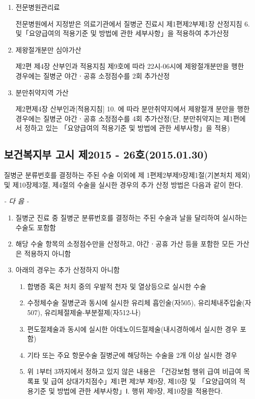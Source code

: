 \begin{enumerate}[가.]
\item 전문병원관리료\par
전문병원에서 지정받은 의료기관에서 질병군 진료시 제1편제2부제1장 산정지침 6. 및「요양급여의 적용기준 및 방법에 관한 세부사항」을 적용하여 추가산정
\item 제왕절개분만 심야가산\par
제2편 제4장 산부인과 적용지침 제9호에 따라 22시-06시에 제왕절개분만을 행한 경우에는 질병군 야간ㆍ공휴 소정점수를 2회 추가산정
\item 분만취약지역 가산\par
제2편제4장 산부인과[적용지침] 10. 에 따라 분만취약지에서 제왕절개 분만을 행한 경우에는 질병군 야간ㆍ공휴 소정점수를 4회 추가산정(단, 분만취약지는 제1편에서 정하고 있는 「요양급여의 적용기준 및 방법에 관한 세부사항」을 적용)
\end{enumerate}

\clearpage
\subsection{보건복지부 고시 제2015 - 26호(2015.01.30)}
질병군 분류번호를 결정하는 주된 수술 이외에 제 1편제2부제9장제1절(기본처치 제외) 및 제10장제3절, 제4절의 수술을 실시한 경우의 추가 산정 방법은 다음과 같이 한다.\par
\begin{center}\emph{- 다 음 -}\end{center}
\begin{enumerate}[1.]\tightlist
\item 질병군 진료 중 질병군 분류번호를 결정하는 주된 수술과 날을 달리하여 실시하는 수술도 포함함
\item 해당 수술 항목의 소정점수만을 산정하고, 야간ㆍ공휴 가산 등을 포함한 모든 가산은 적용하지 아니함
\item 아래의 경우는 추가 산정하지 아니함
	\begin{enumerate}[가.]\tightlist
	\item 합병증 혹은 처치 중의 우발적 천자 및 열상등으로 실시한 수술
	\item 수정체수술 질병군과 동시에 실시한 유리체 흡인술(자505), 유리체내주입술(자507), 유리체절제술-부분절제(자512-나)
	\item 편도절제술과 동시에 실시한 아데노이드절제술(내시경하에서 실시한 경우 포함)
	\item 기타 또는 주요 항문수술 질병군에 해당하는 수술을 2개 이상 실시한 경우
	\item 위 1부터 3까지에서 정하고 있지 않은 내용은 「건강보험 행위 급여 비급여 목록표 및 급여 상대가치점수」제1편 제2부 제9장, 제10장 및 「요양급여의 적용기준 및 방법에 관한 세부사항」Ⅰ. 행위 제9장, 제10장을 적용한다.
	\end{enumerate}
\end{enumerate}

